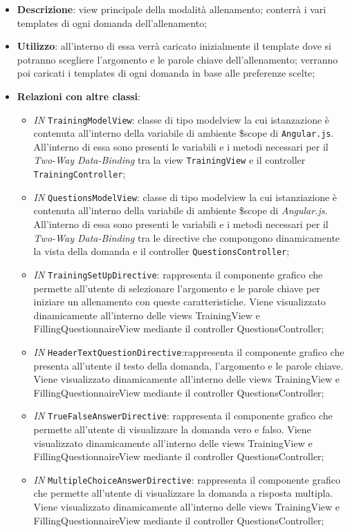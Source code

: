 \begin{itemize}
	\item \textbf{Descrizione}: view principale della modalità allenamento; conterrà i vari templates di ogni domanda dell'allenamento;
	\item \textbf{Utilizzo}: all'interno di essa verrà caricato inizialmente il template dove si potranno scegliere l'argomento e le parole chiave dell'allenamento; verranno poi caricati i templates di ogni domanda in base alle preferenze scelte; 
	\item \textbf{Relazioni con altre classi}:
	\begin{itemize}
		\item \textit{IN} \texttt{TrainingModelView}: classe di tipo modelview la cui istanzazione è contenuta all'interno della variabile di ambiente \$scope di \texttt{Angular.js}. All'interno di essa sono presenti le variabili e i metodi necessari per il \textit{Two-Way Data-Binding} tra la view \texttt{TrainingView} e il controller \texttt{TrainingController};
		\item \textit{IN} \texttt{QuestionsModelView}: classe di tipo modelview la cui istanziazione è contenuta all'interno della variabile di ambiente \$scope di \textit{Angular.js}. All'interno di essa sono presenti le variabili e i metodi necessari per il \textit{Two-Way Data-Binding} tra le directive che compongono dinamicamente la vista della domanda e il controller \texttt{QuestionsController};
		\item \textit{IN} \texttt{TrainingSetUpDirective}: rappresenta il componente grafico che permette all'utente di selezionare l'argomento e le parole chiave per iniziare un allenamento con queste caratteristiche. Viene visualizzato	dinamicamente all'interno delle views TrainingView e FillingQuestionnaireView mediante il controller QuestionsController;
		\item \textit{IN} \texttt{HeaderTextQuestionDirective}:rappresenta il componente grafico che presenta all'utente il testo della domanda, l'argomento e le parole chiave. Viene visualizzato dinamicamente all'interno delle views TrainingView e FillingQuestionnaireView mediante il controller QuestionsController;
		\item \textit{IN} \texttt{TrueFalseAnswerDirective}: rappresenta il componente grafico che permette all'utente di visualizzare la domanda vero e falso. Viene visualizzato dinamicamente all'interno delle views TrainingView e FillingQuestionnaireView mediante il controller QuestionsController;
		\item \textit{IN} \texttt{MultipleChoiceAnswerDirective}: rappresenta il componente grafico che permette all'utente di visualizzare la domanda a risposta multipla. Viene visualizzato dinamicamente all'interno delle views TrainingView e FillingQuestionnaireView mediante il controller QuestionsController;

\end{itemize}
\end{itemize}
